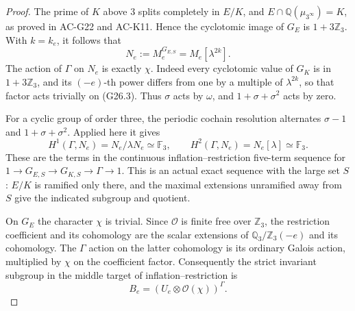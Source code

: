 \begin{proof}
The prime of $K$ above $3$ splits completely in $E/K$,
and $E\cap\mathbb Q(\mu_{3^\infty})=K$, as proved in
AC-G22 and AC-K11.  Hence the cyclotomic image of $G_E$ is
$1+3\mathbb Z_3$.  With $k=k_e$, it follows that
\[
 N_e:=M_e^{G_{E,S}}=M_e[\lambda^{2k}].                  \tag{G26.3}
\]
The action of $\Gamma$ on $N_e$ is exactly $\chi$.
Indeed every cyclotomic value of $G_K$ is in
$1+3\mathbb Z_3$, and its $(-e)$-th power differs from one
by a multiple of $\lambda^{2k}$, so that factor acts trivially
on (G26.3).  Thus $\sigma$ acts by $\omega$, and
$1+\sigma+\sigma^2$ acts by zero.

For a cyclic group of order three, the periodic cochain resolution
alternates $\sigma-1$ and $1+\sigma+\sigma^2$.  Applied here it
gives
\[
 H^1(\Gamma,N_e)=N_e/\lambda N_e\simeq\mathbb F_3,
 \qquad
 H^2(\Gamma,N_e)=N_e[\lambda]\simeq\mathbb F_3.         \tag{G26.4}
\]
These are the terms in the continuous inflation--restriction
five-term sequence for
$1\to G_{E,S}\to G_{K,S}\to\Gamma\to1$.
This is an actual exact sequence with the large set $S$:
$E/K$ is ramified only there, and the maximal extensions
unramified away from $S$ give the indicated subgroup and quotient.

On $G_E$ the character $\chi$ is trivial.  Since $\mathcal O$
is finite free over $\mathbb Z_3$, the restriction coefficient
and its cohomology are the scalar extensions of
$\mathbb Q_3/\mathbb Z_3(-e)$ and its cohomology.  The
$\Gamma$ action on the latter cohomology is its ordinary Galois
action, multiplied by $\chi$ on the coefficient factor.
Consequently the strict invariant subgroup in the middle target
of inflation--restriction is
\[
                 B_e=(U_e\otimes\mathcal O(\chi))^\Gamma.
                                                               \tag{G26.5}
\]


\end{proof}
